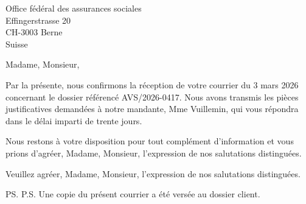 \documentclass[a4paper,10pt,foldmark,leftwin]{chletter}
\begin{document}
\begin{letter}{Office fédéral des assurances sociales\\
  Effingerstrasse 20\\
  CH-3003 Berne\\
  Suisse}

\opening{Madame, Monsieur,}

Par la présente, nous confirmons la réception de votre courrier du 3
mars 2026 concernant le dossier référencé AVS/2026-0417. Nous avons
transmis les pièces justificatives demandées à notre mandante, Mme
Vuillemin, qui vous répondra dans le délai imparti de trente jours.

Nous restons à votre disposition pour tout complément d'information
et vous prions d'agréer, Madame, Monsieur, l'expression de nos
salutations distinguées.

\closing{Veuillez agréer, Madame, Monsieur, l'expression de nos
salutations distinguées.}

\ps{P.S. Une copie du présent courrier a été versée au dossier
client.}

\end{letter}
\end{document}

